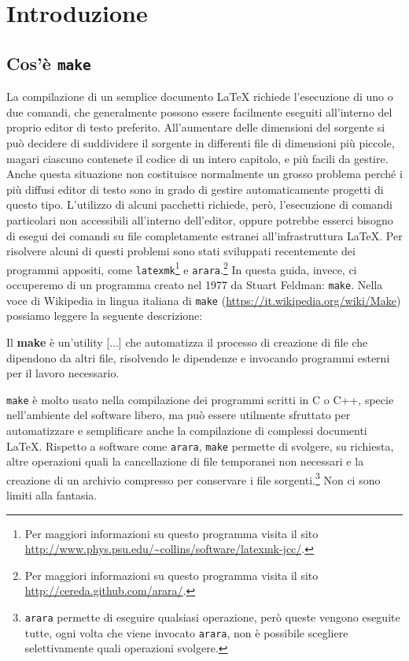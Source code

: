 \section{Introduzione}
\label{sec:introduzione}

\subsection{Cos'è \texttt{make}}
\label{sec:cose-make}

La compilazione di un semplice documento \LaTeX{}
richiede l'esecuzione di uno o due comandi, che generalmente possono essere
facilmente eseguiti all'interno del proprio editor di testo preferito.
All'aumentare delle dimensioni del sorgente si può decidere di suddividere il
sorgente in differenti file di dimensioni più piccole, magari ciascuno contenete
il codice di un intero capitolo, e più facili da gestire.  Anche questa
situazione non costituisce normalmente un grosso problema perché i più diffusi
editor di testo sono in grado di gestire automaticamente progetti di questo
tipo.  L'utilizzo di alcuni pacchetti richiede, però, l'esecuzione di comandi
particolari non accessibili all'interno dell'editor, oppure potrebbe esserci
bisogno di esegui dei comandi su file completamente estranei all'infrastruttura
\LaTeX{}.
Per risolvere alcuni di questi problemi sono stati sviluppati recentemente dei
programmi appositi, come
\texttt{latexmk}\footnote{Per maggiori informazioni su questo programma visita
  il sito \url{http://www.phys.psu.edu/~collins/software/latexmk-jcc/}.}
e
\texttt{arara}.\footnote{Per maggiori informazioni su questo programma visita il
  sito \url{http://cereda.github.com/arara/}.}
In questa guida, invece, ci occuperemo di un programma creato nel 1977 da Stuart
Feldman: \texttt{make}.  Nella voce di Wikipedia in lingua italiana di
\texttt{make} (\url{https://it.wikipedia.org/wiki/Make}) possiamo leggere la
seguente descrizione:
\begin{quoting}
  Il \textbf{make} è un'utility [...] che automatizza il processo di creazione
  di file che dipendono da altri file, risolvendo le dipendenze e invocando
  programmi esterni per il lavoro necessario.
\end{quoting}
\texttt{make} è molto usato nella compilazione dei programmi scritti in C o C++,
specie nell'ambiente del software libero, ma può essere utilmente sfruttato per
automatizzare e semplificare anche la compilazione di complessi documenti
\LaTeX{}.
Rispetto a software come \texttt{arara}, \texttt{make} permette di svolgere, su
richiesta, altre operazioni quali la cancellazione di file temporanei non
necessari e la creazione di un archivio compresso per conservare i file
sorgenti.\footnote{\texttt{arara} permette di eseguire qualsiasi operazione,
  però queste vengono eseguite tutte, ogni volta che viene invocato
  \texttt{arara}, non è possibile scegliere selettivamente quali operazioni
  svolgere.}  Non ci sono limiti alla fantasia.

